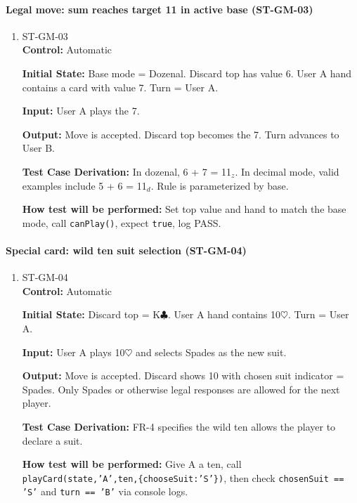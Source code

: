 \documentclass[12pt, titlepage]{article}
\begin{document}
\paragraph{Legal move: sum reaches target 11 in active base (ST-GM-03)}
\begin{enumerate}
\item{ST-GM-03\\}
\textbf{Control:} Automatic

\textbf{Initial State:} Base mode = Dozenal. Discard top has value 6. User A hand contains a card with value 7. Turn = User A.

\textbf{Input:} User A plays the 7.

\textbf{Output:} Move is accepted. Discard top becomes the 7. Turn advances to User B.

\textbf{Test Case Derivation:} In dozenal, 6 + 7 = 11$_{z}$. In decimal mode, valid examples include 5 + 6 = 11$_{d}$. Rule is parameterized by base.

\textbf{How test will be performed:} Set top value and hand to match the base mode, call \texttt{canPlay()}, expect \texttt{true}, log PASS.
\end{enumerate}

\paragraph{Special card: wild ten suit selection (ST-GM-04)}
\begin{enumerate}
\item{ST-GM-04\\}
\textbf{Control:} Automatic

\textbf{Initial State:} Discard top = K$\clubsuit$. User A hand contains 10$\heartsuit$. Turn = User A.

\textbf{Input:} User A plays 10$\heartsuit$ and selects Spades as the new suit.

\textbf{Output:} Move is accepted. Discard shows 10 with chosen suit indicator = Spades. Only Spades or otherwise legal responses are allowed for the next player.

\textbf{Test Case Derivation:} FR-4 specifies the wild ten allows the player to declare a suit.

\textbf{How test will be performed:} Give A a ten, call \texttt{playCard(state,'A',ten,\{chooseSuit:'S'\})}, then check \texttt{chosenSuit == 'S'} and \texttt{turn == 'B'} via console logs.
\end{enumerate}
\end{document}
